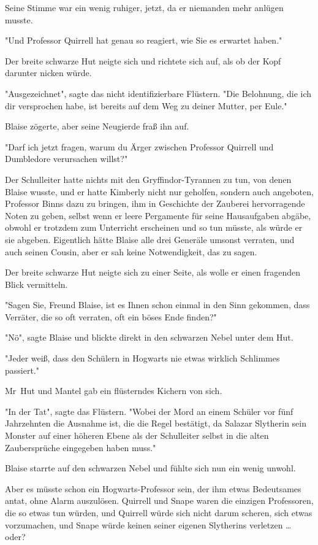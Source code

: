 {Seine Stimme war ein wenig ruhiger, jetzt, da er niemanden mehr anlügen musste.

"Und Professor Quirrell hat genau so reagiert, wie Sie es erwartet haben."

Der breite schwarze Hut neigte sich und richtete sich auf, als ob der Kopf darunter nicken würde.

"Ausgezeichnet", sagte das nicht identifizierbare Flüstern. "Die Belohnung, die ich dir versprochen habe, ist bereits auf dem Weg zu deiner Mutter, per Eule."

Blaise zögerte, aber seine Neugierde fraß ihn auf.

"Darf ich jetzt fragen, warum du Ärger zwischen Professor Quirrell und Dumbledore verursachen willst?"

Der Schulleiter hatte nichts mit den Gryffindor-Tyrannen zu tun, von denen Blaise wusste, und er hatte Kimberly nicht nur geholfen, sondern auch angeboten, Professor Binns dazu zu bringen, ihm in Geschichte der Zauberei hervorragende Noten zu geben, selbst wenn er leere Pergamente für seine Hausaufgaben abgäbe, obwohl er trotzdem zum Unterricht erscheinen und so tun müsste, als würde er sie abgeben. Eigentlich hätte Blaise alle drei Generäle umsonst verraten, und auch seinen Cousin, aber er sah keine Notwendigkeit, das zu sagen.

Der breite schwarze Hut neigte sich zu einer Seite, als wolle er einen fragenden Blick vermitteln.

"Sagen Sie, Freund Blaise, ist es Ihnen schon einmal in den Sinn gekommen, dass Verräter, die so oft verraten, oft ein böses Ende finden?"

"Nö", sagte Blaise und blickte direkt in den schwarzen Nebel unter dem Hut.

"Jeder weiß, dass den Schülern in Hogwarts nie etwas wirklich Schlimmes passiert."

Mr~Hut und Mantel gab ein flüsterndes Kichern von sich.

"In der Tat", sagte das Flüstern. "Wobei der Mord an einem Schüler vor fünf Jahrzehnten die Ausnahme ist, die die Regel bestätigt, da Salazar Slytherin sein Monster auf einer höheren Ebene als der Schulleiter selbst in die alten Zaubersprüche eingegeben haben muss."

Blaise starrte auf den schwarzen Nebel und fühlte sich nun ein wenig unwohl.

Aber es müsste schon ein Hogwarts-Professor sein, der ihm etwas Bedeutsames antat, ohne Alarm auszulösen. Quirrell und Snape waren die einzigen Professoren, die so etwas tun würden, und Quirrell würde sich nicht darum scheren, sich etwas vorzumachen, und Snape würde keinen seiner eigenen Slytherins verletzen … oder?

}
